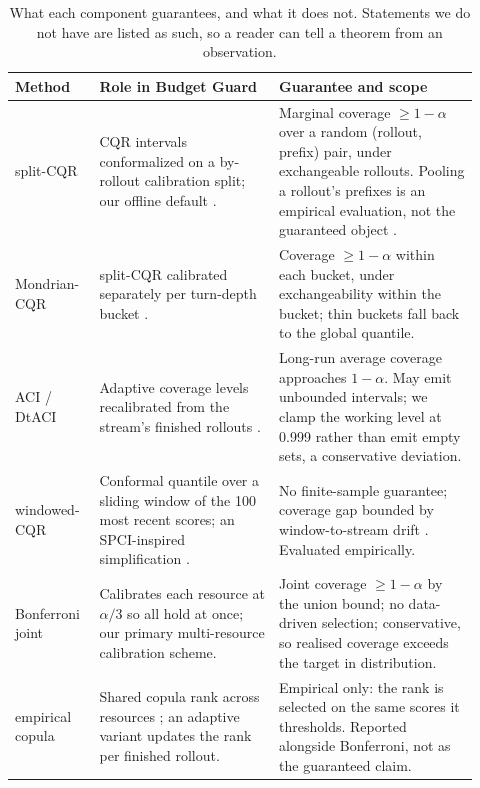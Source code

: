 \documentclass{article}
\newcommand{\bg}{Budget Guard}
\begin{document}
\begin{table}[t]
  \caption{What each component guarantees, and what it does not. Statements we do not
  have are listed as such, so a reader can tell a theorem from an observation.}
  \label{tab:a1}
  \centering
  \footnotesize
  \begin{tabular}{@{}p{0.16\linewidth}p{0.36\linewidth}p{0.40\linewidth}@{}}
    \toprule
    Method & Role in \bg{} & Guarantee and scope \\
    \midrule
    split-CQR & CQR intervals conformalized on a by-rollout calibration split; our
    offline default \cite{romano2019cqr}. & Marginal coverage $\geq 1{-}\alpha$ over a
    random (rollout, prefix) pair, under exchangeable rollouts. Pooling a rollout's
    prefixes is an empirical evaluation, not the guaranteed object
    \cite{lei2018distribution}. \\
    \addlinespace
    Mondrian-CQR & split-CQR calibrated separately per turn-depth bucket
    \cite{vovk2012conditional}. & Coverage $\geq 1{-}\alpha$ within each bucket, under
    exchangeability within the bucket; thin buckets fall back to the global quantile. \\
    \addlinespace
    ACI / DtACI & Adaptive coverage levels recalibrated from the stream's finished
    rollouts \cite{gibbs2021aci,gibbs2024dtaci}. & Long-run average coverage approaches
    $1{-}\alpha$. May emit unbounded intervals; we clamp the working level at 0.999
    rather than emit empty sets, a conservative deviation. \\
    \addlinespace
    windowed-CQR & Conformal quantile over a sliding window of the 100 most recent
    scores; an SPCI-inspired simplification \cite{xu2023spci}. & No finite-sample
    guarantee; coverage gap bounded by window-to-stream drift \cite{barber2023beyond}.
    Evaluated empirically. \\
    \addlinespace
    Bonferroni joint & Calibrates each resource at $\alpha/3$ so all hold at once; our
    primary multi-resource calibration scheme. & Joint coverage $\geq 1{-}\alpha$ by
    the union bound; no data-driven selection; conservative, so realised coverage
    exceeds the target in distribution. \\
    \addlinespace
    empirical copula & Shared copula rank across resources \cite{messoudi2021copula};
    an adaptive variant updates the rank per finished rollout. & Empirical only: the
    rank is selected on the same scores it thresholds. Reported alongside Bonferroni,
    not as the guaranteed claim. \\

\end{tabular}
\end{table}
\end{document}
